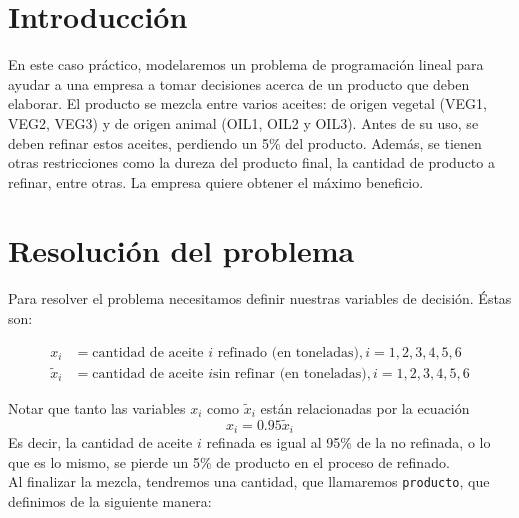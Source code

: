 \documentclass[12pt,a4paper,twoside,openright,titlepage,final]{article}
\author{José Ignacio Escribano}
\title{}
\begin{document}
\setcounter{page}{1}


\listoffigures
\thispagestyle{empty}
\newpage

\listoftables
\thispagestyle{empty}
\newpage

\tableofcontents
\thispagestyle{empty}
\newpage


\setcounter{page}{1}

\section{Introducción}

En este caso práctico, modelaremos un problema de programación lineal para ayudar a una empresa a tomar decisiones acerca de un producto que deben elaborar. El producto se mezcla entre varios aceites: de origen vegetal (VEG1, VEG2, VEG3) y de origen animal (OIL1, OIL2 y OIL3). Antes de su uso, se deben refinar estos aceites, perdiendo un 5\% del producto. Además, se tienen otras restricciones como la dureza del producto final, la cantidad de producto a refinar, entre otras. La empresa quiere obtener el máximo beneficio.

\section{Resolución del problema}

Para resolver el problema necesitamos definir nuestras variables de decisión. Éstas son:

\begin{align*}
x_i & = \text{cantidad de aceite } i \text{ refinado (en toneladas)}, i=1,2,3,4,5,6 \\
\tilde{x}_i & = \text{cantidad de aceite } i \text{sin refinar (en toneladas)}, i=1,2,3,4,5,6
\end{align*}

Notar que tanto las variables $x_i$ como $\tilde{x}_i$ están relacionadas por la ecuación 
\[x_i = 0.95\tilde{x}_i \]
Es decir, la cantidad de aceite $i$ refinada es igual al 95\% de la no refinada, o lo que es lo mismo, se pierde un 5\% de producto en el proceso de refinado.\\
 
Al finalizar la mezcla, tendremos una cantidad, que llamaremos \texttt{producto}, que definimos de la siguiente manera:
\end{document}
